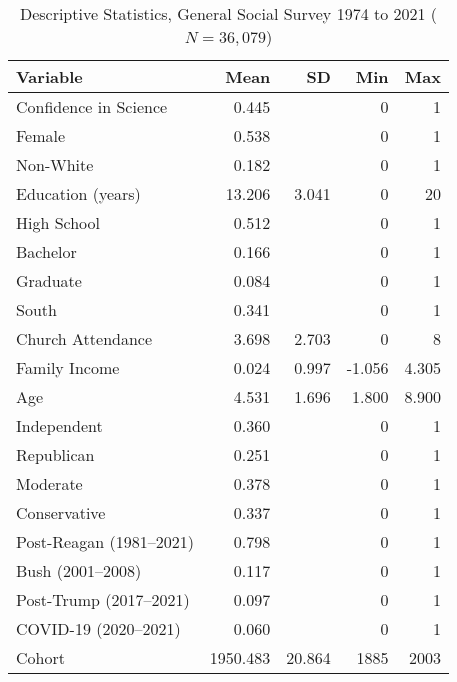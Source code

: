 \begin{table}[ht]
\centering
\begin{tabularx}{\textwidth}{Xrrrr}
\caption{Descriptive Statistics, General Social Survey 1974 to 2021 ($N=36,079$)} 
\label{table:GssStats} \\
  \toprule
Variable & Mean & SD & Min & Max \\ 
  \midrule
Confidence in Science & 0.445 &  & 0 & 1 \\ 
  Female & 0.538 &  & 0 & 1 \\ 
  Non-White & 0.182 &  & 0 & 1 \\ 
  Education (years) & 13.206 & 3.041 & 0 & 20 \\ 
  High School & 0.512 &  & 0 & 1 \\ 
  Bachelor & 0.166 &  & 0 & 1 \\ 
  Graduate & 0.084 &  & 0 & 1 \\ 
  South & 0.341 &  & 0 & 1 \\ 
  Church Attendance & 3.698 & 2.703 & 0 & 8 \\ 
  Family Income & 0.024 & 0.997 & -1.056 & 4.305 \\ 
  Age & 4.531 & 1.696 & 1.800 & 8.900 \\ 
  Independent & 0.360 &  & 0 & 1 \\ 
  Republican & 0.251 &  & 0 & 1 \\ 
  Moderate & 0.378 &  & 0 & 1 \\ 
  Conservative & 0.337 &  & 0 & 1 \\ 
  Post-Reagan (1981--2021) & 0.798 &  & 0 & 1 \\ 
  Bush (2001--2008) & 0.117 &  & 0 & 1 \\ 
  Post-Trump (2017--2021) & 0.097 &  & 0 & 1 \\ 
  COVID-19 (2020--2021) & 0.060 &  & 0 & 1 \\ 
  Cohort & 1950.483 & 20.864 & 1885 & 2003 \\ 
   \bottomrule
\end{tabularx}
\end{table}
